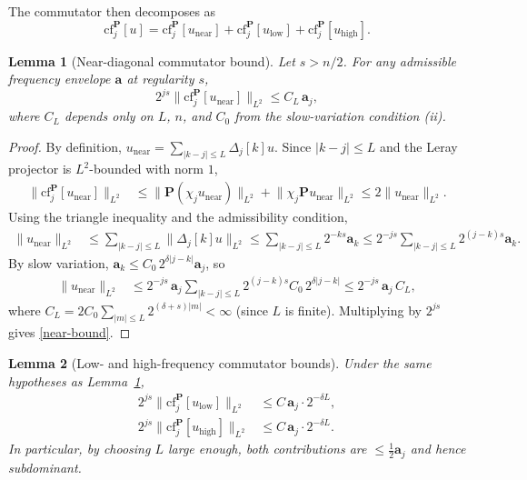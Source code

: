\documentclass[11pt]{article}
\newtheorem{lemma}{Lemma}
\theoremstyle{definition}
\newcommand{\PP}{\mathbf{P}}          %
\newcommand{\Dj}{\Delta_j}            %
\newcommand{\Lp}[1]{L^{#1}}
\newcommand{\norm}[1]{\lVert #1 \rVert}
\newcommand{\abs}[1]{\lvert #1 \rvert}
\newcommand{\cf}{\mathrm{cf}}         %
\newcommand{\env}{\mathbf{a}}         %
\begin{document}
The commutator then decomposes as
\begin{equation}\label{comm-decomp}
  \cf_j^{\PP}[u]
  = \cf_j^{\PP}[u_{\mathrm{near}}]
  + \cf_j^{\PP}[u_{\mathrm{low}}]
  + \cf_j^{\PP}[u_{\mathrm{high}}].
\end{equation}

\begin{lemma}[Near-diagonal commutator bound]\label{lem:near}
Let $s > n/2$.  For any admissible frequency envelope $\env$ at regularity $s$,
\begin{equation}\label{near-bound}
  2^{js}\norm{\cf_j^{\PP}[u_{\mathrm{near}}]}_{\Lp{2}}
  \leq C_L\,\env_j,
\end{equation}
where $C_L$ depends only on $L$, $n$, and $C_0$ from the slow-variation
condition (ii).
\end{lemma}

\begin{proof}
By definition, $u_{\mathrm{near}} = \sum_{\abs{k-j}\leq L}\Dj[k] u$.
Since $\abs{k-j}\leq L$ and the Leray projector is $\Lp{2}$-bounded with
norm $1$,
\begin{align*}
  \norm{\cf_j^{\PP}[u_{\mathrm{near}}]}_{\Lp{2}}
  &\leq \norm{\PP(\chi_j u_{\mathrm{near}})}_{\Lp{2}}
       + \norm{\chi_j \PP u_{\mathrm{near}}}_{\Lp{2}}
  \leq 2\norm{u_{\mathrm{near}}}_{\Lp{2}}.
\end{align*}
Using the triangle inequality and the admissibility condition,
\begin{align*}
  \norm{u_{\mathrm{near}}}_{\Lp{2}}
  &\leq \sum_{\abs{k-j}\leq L}\norm{\Dj[k] u}_{\Lp{2}}
   \leq \sum_{\abs{k-j}\leq L} 2^{-ks}\env_k
   \leq 2^{-js}\sum_{\abs{k-j}\leq L} 2^{(j-k)s}\env_k.
\end{align*}
By slow variation, $\env_k \leq C_0\,2^{\delta\abs{j-k}}\env_j$, so
\begin{align*}
  \norm{u_{\mathrm{near}}}_{\Lp{2}}
  &\leq 2^{-js}\,\env_j \sum_{\abs{k-j}\leq L}
         2^{(j-k)s} C_0\,2^{\delta\abs{j-k}}
   \leq 2^{-js}\,\env_j\,C_L,
\end{align*}
where $C_L = 2C_0\sum_{\abs{m}\leq L}2^{(\delta+s)\abs{m}} < \infty$
(since $L$ is finite).  Multiplying by $2^{js}$ gives \eqref{near-bound}.
\end{proof}

\begin{lemma}[Low- and high-frequency commutator bounds]\label{lem:lh}
Under the same hypotheses as Lemma~\ref{lem:near},
\begin{align}
  2^{js}\norm{\cf_j^{\PP}[u_{\mathrm{low}}]}_{\Lp{2}}
  &\leq C\,\env_j \cdot 2^{-\delta L},
  \label{low-bound}\\
  2^{js}\norm{\cf_j^{\PP}[u_{\mathrm{high}}]}_{\Lp{2}}
  &\leq C\,\env_j \cdot 2^{-\delta L}.
  \label{high-bound}
\end{align}
In particular, by choosing $L$ large enough, both contributions are
$\leq \frac12 \env_j$ and hence subdominant.
\end{lemma}
\end{document}
